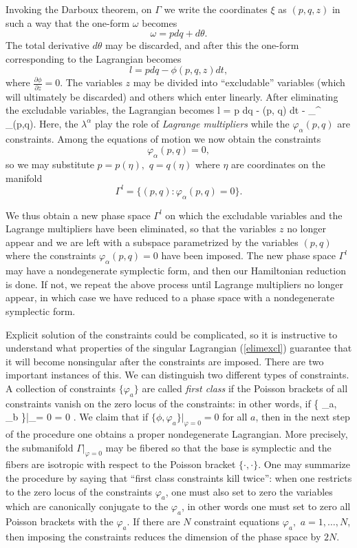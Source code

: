 Invoking the Darboux theorem, 
on  $\Gamma $ we write the coordinates
$\xi$ as $(p, q, z)$ in such a way that the one-form $\omega$ becomes
$$ \omega = p dq + d \theta.$$
The total derivative $d \theta$ may be discarded, and after this the 
one-form corresponding to the 
Lagrangian becomes
$$ l = p dq - \phi(p,q, z) dt, $$
where
$\frac{\partial \phi}{\partial z} = 0 . $ 
The variables $z$ may be divided into ``excludable'' variables (which will
ultimately be discarded) and others which enter linearly. After 
eliminating the excludable variables, the Lagrangian becomes
\beq \label{elimexcl} l = p dq - \phi(p, q) dt - \sum_\alpha \lambda^\alpha 
\varphi_\alpha (p,q). \eeq
Here, the $\lambda^\alpha $ play the role of {\em Lagrange multipliers}
while the $\varphi_\alpha(p,q)$ are constraints. Among the 
equations of motion we now obtain the 
constraints
$$\varphi_\alpha(p,q) = 0, $$
so we may substitute $p = p(\eta), $ $ q = q(\eta)$ where
$\eta$ are coordinates on the manifold 
$$ \Gamma^l = \{ (p,q):  \varphi_\alpha(p,q) = 0 \} . $$

We thus obtain a new phase space $\Gamma^l $ on which the 
excludable variables and the Lagrange multipliers have been eliminated,
so that the variables $z$ no longer appear and we are left with
a subspace parametrized by   the variables $(p,q)$  where the 
constraints $\varphi_\alpha(p,q) = 0 $ have been imposed. 
The new phase space $\Gamma^l$ may have a nondegenerate symplectic 
form, and then our
Hamiltonian reduction is done.  
If not, we repeat the above process until Lagrange multipliers
 no longer appear, 
in which case we have reduced to  a phase space with a 
nondegenerate symplectic form. 

Explicit solution of the constraints could be complicated, 
so it is instructive to understand what properties of the 
singular Lagrangian (\ref{elimexcl}) guarantee that it will 
become nonsingular after the constraints are imposed. There are two 
important instances of this. 
We can distinguish two different types of constraints. A collection 
of constraints $\{ \varphi_a \}$ are called 
{\em first class} if the Poisson brackets of all constraints
vanish on the zero locus of the constraints: in other words, if 
\beq \{ \varphi_a, \varphi_b \}|_{\varphi = 0 } = 0 . \eeq
We claim that if $\{ \phi, \varphi_a\}|_{\varphi = 0 }  = 0  $ for 
all $a$, then in the next step of the procedure one obtains a proper
nondegenerate Lagrangian. More precisely, the submanifold 
$\Gamma|_{\varphi = 0 } $ may be fibered so that the base is symplectic 
and the fibers are isotropic with respect to the Poisson bracket 
$\{ \cdot, \cdot \}$. One may summarize the procedure by saying that
``first class constraints kill twice'': when one restricts to the 
zero locus of the constraints $\varphi_a$,
 one must also set to zero the variables
which are canonically conjugate to the $\varphi_a$, in 
other words one must set to zero all Poisson brackets with 
the $\varphi_a$.  If there are 
$N$ constraint equations $\varphi_a, $ $ a = 1, \dots, N$, 
then imposing the constraints reduces
the  dimension of the phase space by $2N$. 

